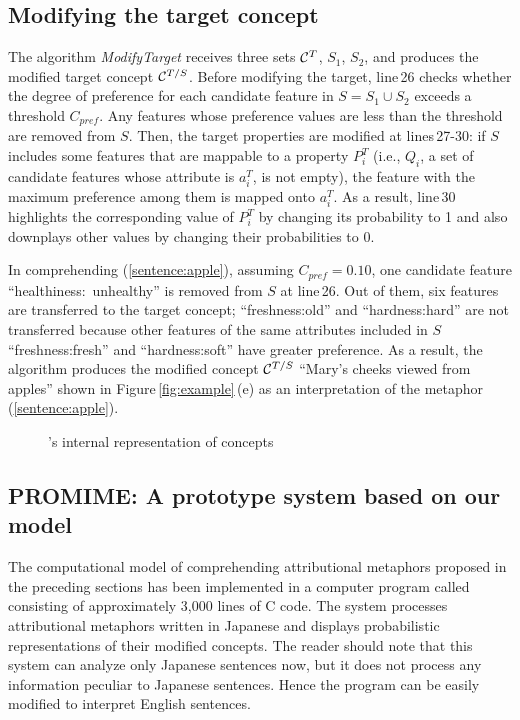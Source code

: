 \subsection{Modifying the target concept} \label{subsec:modify}
The algorithm {\it ModifyTarget\/} receives three sets ${\cal C}^T$,
$S_1$, $S_2$, and produces the modified target concept ${\cal C}^{T/S}$.
Before modifying the target, line\,26 checks
 whether the degree of preference for each candidate feature in $S=S_1 \cup
S_2$ exceeds a threshold $C_{pref}$. Any features whose preference values
are less than the threshold are removed from $S$.
Then, the target properties are modified at lines\,27-30: 
if $S$ includes some features that are mappable to a property $P^T_i$
(i.e., $Q_i$, a set of candidate features whose attribute is $a^T_i$, is not empty),
the feature with the maximum preference among them is mapped onto $a^T_i$.
As a result, line\,30 highlights the corresponding value of $P^T_i$ 
by changing its probability to 1
and also downplays other values by changing their probabilities to 0.

In comprehending (\ref{sentence:apple}), assuming $C_{pref} = 0.10$,
one candidate feature ``healthiness:\ unhealthy'' is removed from $S$ at line\,26.
Out of them, six features are transferred to the target concept;
``freshness:old'' and ``hardness:hard'' are not transferred
because other features of the same attributes included in $S$
``freshness:fresh'' and ``hardness:soft'' have greater preference.
As a result, the algorithm produces the modified concept ${\cal C}^{T/S}$
``Mary's cheeks viewed from apples'' shown in Figure\,\ref{fig:example}\,(e)
as an interpretation of the metaphor (\ref{sentence:apple}).

\begin{figure}[t]
  \begin{center}
    \makeatletter\ifDS@epsbox
    \else
    \mbox{}
    \fi\makeatother
    
  \end{center}
  \caption{\SNAME's internal representation of concepts}
  \label{fig:knowledge}
\end{figure}

\subsection{{\sfb PROMIME}: A prototype system based on our model} \label{sec:system}
The computational model of comprehending attributional metaphors
proposed in the preceding sections has been implemented in a computer
program called \SNAME\/ consisting of approximately 3,000 lines of C code. 
The \SNAME\/ system processes attributional metaphors 
written in Japanese and displays probabilistic representations
of their modified concepts.  The reader should note that this system
can analyze only Japanese sentences now, but it does not process any
information peculiar to Japanese sentences. Hence the program can be
easily modified to interpret English sentences.

